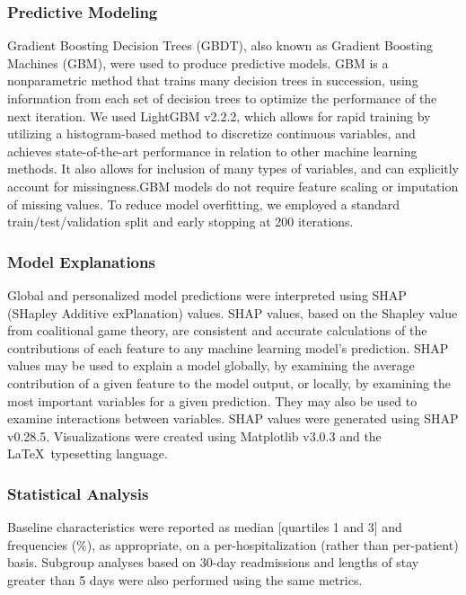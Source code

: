 \subsubsection{Predictive Modeling}
Gradient Boosting Decision Trees (GBDT), also known as 
Gradient Boosting Machines (GBM), were used to produce predictive models.\@
GBM is a nonparametric method that trains many decision trees in succession, using
information from each set of decision trees to optimize the performance
of the next iteration.\supercite{gbmtutorial} We used LightGBM v2.2.2,
which allows for rapid training by utilizing a histogram-based method
to discretize continuous variables, and achieves state-of-the-art performance in relation
to other machine learning methods.\supercite{lightgbm} It also allows for
inclusion of many types of variables, and can explicitly
account for missingness.\@ GBM models do not require feature scaling
or imputation of missing values.\@
To reduce model overfitting, we employed a standard train/test/validation split\supercite{esl}
and early stopping at 200 iterations.\supercite{zhang2005boosting}

\subsubsection{Model Explanations}
Global and personalized model predictions were interpreted using SHAP (SHapley Additive exPlanation) values.\supercite{lundberg2017unified}\@
SHAP values, based on the Shapley value from coalitional game theory, 
are consistent and accurate calculations of the contributions of each feature to any machine learning model's prediction.\@
SHAP values may be used to explain a model globally, by examining the average contribution of a given feature
to the model output, or locally, by examining the most important variables for a given prediction.\supercite{lundberg2018explainable} \@
They may also be used to examine interactions between variables.\@
SHAP values were generated using SHAP v0.28.5.\@
Visualizations were created using Matplotlib v3.0.3\supercite{matplotlib} and the \LaTeX\ typesetting language.\@


\subsubsection{Statistical Analysis}
Baseline characteristics were reported as median [quartiles 1 and 3] and frequencies (\%), as appropriate, on a per-hospitalization (rather than per-patient) basis.\@
Subgroup analyses based on 30-day readmissions and lengths of stay greater than 5 days were also performed using the same metrics.\@

